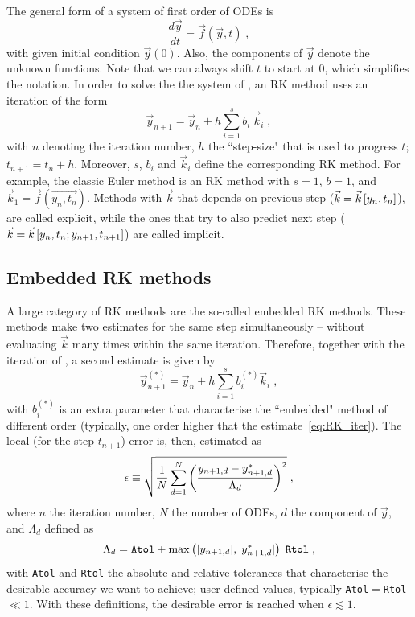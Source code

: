 \documentclass[11pt,a4paper]{article}
\begin{document}
The general form of a system of first order of ODEs is
%
\begin{equation}
	\dfrac{d\vec{y}}{dt}=\vec{f}(\vec{y},t) \;,
	\label{eq:ODE_definition}
\end{equation}
%
with given initial condition $\vec{y}(0)$. Also, the components of $\vec{y}$ denote the unknown functions. Note that we can always shift $t$ to start at $0$, which simplifies the notation. In order to solve the the system of , an RK method uses an iteration of the form 
%
\begin{equation}
	\vec{y}_{n+1}=\vec{y}_{n}+ h\sum_{i=1}^{s} b_i \ \vec{k}_i \;,
	\label{eq:RK_iter}
\end{equation}
%
with $n$ denoting the iteration number, $h$ the ``step-size" that is used to progress $t$; $t_{n+1}=t_{n}+h$. Moreover, $s$, $b_i$ and $\vec{k}_i$ define the corresponding RK method. For example,
the classic Euler method is an RK method with $s=1$, $b=1$, and $\vec{k}_1 = \vec{f}(\vec{y_n , t_n})$. Methods with $\vec{k}$ that depends on previous step (\ie $\vec{k} =\vec{k}\left[ y_{n},t_{n} \right]$), are called explicit, while the ones that try to also predict next step (\ie $\vec{k} =\vec{k}\left[ y_{n},t_{n}; y_{n+1},t_{n+1} \right]$) are called implicit. 

\subsection{Embedded RK methods}
%
A large category of RK methods are  the so-called embedded RK methods. These methods make two estimates for the same step simultaneously -- without evaluating  $\vec{k}$ many times within the same iteration. Therefore, together with the iteration of , a second estimate is given by
%
\begin{equation}
	\vec{y}_{n+1}^{(*)}=\vec{y}_{n}+ h\sum_{i=1}^{s} b_i^{(*)} \vec{k}_i \;,
	\label{eq:RK_Embedded_iter}
\end{equation}
%
with $b_i^{(*)}$ is an extra parameter that characterise the ``embedded" method of different order (typically, one order higher that the estimate~\ref{eq:RK_iter}). The local (for the step $t_{n+1}$) error is, then, estimated as
%
\begin{equation}
	\epsilon \equiv  \sqrt{\frac{1}{N}\sum_{d=1}^{N}\left( \frac{y_{n+1 ,d}-y^{*}_{n+1,d}}{ \Lambda_d } \right)^{2}} \;,
	\label{eq:error_estimate}
\end{equation}
%
where $n$ the iteration number, $N$ the number of ODEs, $d$ the component of $\vec{y}$, and $\Lambda_d$ defined as 
%
\begin{equation}
	\Lambda_d = {\tt Atol} + \max\left( |y_{n+1, d}|,|y^{*}_{n+1 ,d}| \right) \; {\tt Rtol} \;,
	\label{eq:RK_scale}
\end{equation}
%
with {\tt Atol} and {\tt Rtol} the absolute and relative tolerances that characterise the desirable accuracy we want to achieve; user defined values, typically {\tt Atol}$=${\tt Rtol}$\ll 1$.  With these definitions, the desirable error is reached when  $\epsilon \lesssim 1$. 
\end{document}
